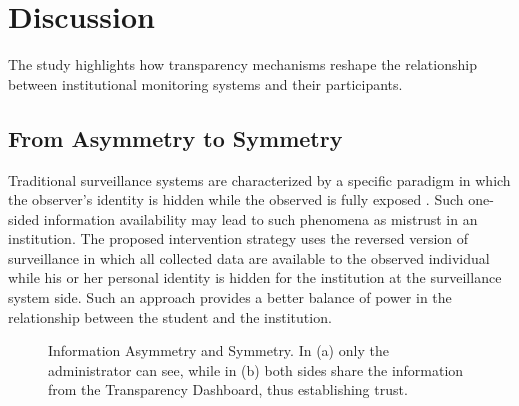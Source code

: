 \documentclass[conference]{IEEEtran}
\begin{document}
\section{Discussion}

The study highlights how transparency mechanisms reshape the relationship between institutional monitoring systems and their participants.

\subsection{From Asymmetry to Symmetry}
Traditional surveillance systems are characterized by a specific paradigm in which the observer’s identity is hidden while the observed is fully exposed \cite{b1}. Such one-sided information availability may lead to such phenomena as mistrust in an institution. The proposed intervention strategy uses the reversed version of surveillance in which all collected data are available to the observed individual while his or her personal identity is hidden for the institution at the surveillance system side. Such an approach provides a better balance of power in the relationship between the student and the institution.

\begin{figure}[htbp]
\centering
{}
\caption{Information Asymmetry and Symmetry. In (a) only the administrator can see, while in (b) both sides share the information from the Transparency Dashboard, thus establishing trust.}
\label{fig:symmetry}
\end{figure}
\end{document}
